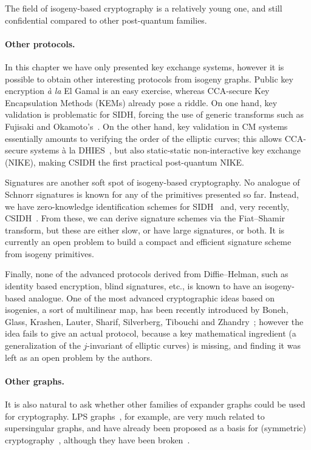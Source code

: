 \documentclass[b5layout]{hdr}
\begin{document}
The field of isogeny-based cryptography is a relatively young one, and
still confidential compared to other post-quantum families. %

\paragraph{Other protocols.}
In this chapter we have only presented key exchange systems, however
it is possible to obtain other interesting protocols from isogeny
graphs. %
Public key encryption \emph{à la} El Gamal is an easy exercise,
whereas CCA-secure Key Encapsulation Methods (KEMs) already pose a
riddle. %
On one hand, key validation is problematic for SIDH, forcing the use
of generic transforms such as Fujisaki and
Okamoto's~\cite{10.1007/3-540-48405-1_34}. %
On the other hand, key validation in CM systems essentially amounts to
verifying the order of the elliptic curves; this allows CCA-secure
systems à la
DHIES~\cite{cryptoeprint:1999:007,10.1007/3-540-45353-9_12,doi:10.1137/S0097539702403773},
but also static-static non-interactive key exchange (NIKE), making
CSIDH the first practical post-quantum NIKE. %

Signatures are another soft spot of isogeny-based cryptography. %
No analogue of Schnorr signatures is known for any of the primitives
presented so far. %
Instead, we have zero-knowledge identification schemes for
SIDH~\cite{defeo+jao+plut12,10.1007/978-3-319-70972-7_9,10.1007/978-3-319-70694-8_1}
and, very recently, CSIDH~\cite{cryptoeprint:2018:824}. %
From these, we can derive signature schemes via the Fiat--Shamir
transform, but these are either slow, or have large signatures, or
both. %
It is currently an open problem to build a compact and efficient
signature scheme from isogeny primitives. %

Finally, none of the advanced protocols derived from Diffie--Helman,
such as identity based encryption, blind signatures, etc., is known to
have an isogeny-based analogue. %
One of the most advanced cryptographic ideas based on isogenies, a
sort of multilinear map, has been recently introduced by Boneh, Glass,
Krashen, Lauter, Sharif, Silverberg, Tibouchi and
Zhandry~\cite{Boneh2018}; however the idea fails to give an actual
protocol, because a key mathematical ingredient (a generalization of
the $j$-invariant of elliptic curves) is missing, and finding it was
left as an open problem by the authors.

\paragraph{Other graphs.}
It is also natural to ask whether other families of expander graphs
could be used for cryptography. %
LPS graphs~\cite{LubPS}, for example, are very much related to
supersingular graphs, and have already been proposed as a basis for
(symmetric) cryptography~\cite{charles+lauter+goren09}, although they
have been broken~\cite{tillich2008collisions,quis}. %
\end{document}
